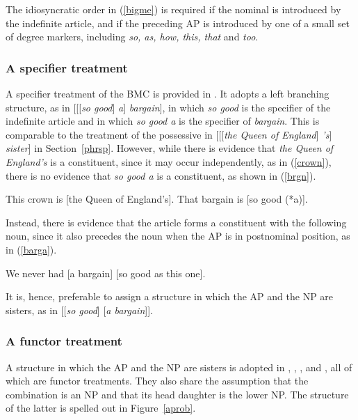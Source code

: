 \documentclass[output=paper
	        ,collection
	        ,collectionchapter
 	        ,biblatex
                ,babelshorthands
                ,newtxmath
                ,draftmode
                ,colorlinks, citecolor=brown
]{langscibook}
\begin{document}
\noindent
The idiosyncratic order in (\ref{bigme}) is required if the nominal is introduced 
by the indefinite article, and if the preceding AP is introduced by one of a small 
set of degree markers, including \emph{so, as, how, this, that} and \emph{too}. 


\subsubsection{A specifier treatment} 


A specifier treatment of the BMC is provided in \citet[201]{GS00}. It adopts  
a left branching structure, as in [[[\emph{so good}] \emph{a}] \emph{bargain}], 
in which \emph{so good} is the specifier of the indefinite article and in which 
\emph{so good a} is the specifier of \emph{bargain}. 
This is comparable to the treatment of the possessive in 
[[[\emph{the Queen of England}] \emph{'s}] \emph{sister}] in Section~\ref{phrsp}.  
However, while there is evidence that \emph{the Queen of England's} is a constituent,
since it may occur independently, as in (\ref{crown}), there is no evidence that 
\emph{so good a} is a constituent, as shown in (\ref{brgn}).

\begin{exe} 
\ex\label{crown}  This crown is [the Queen of England's].
\ex\label{brgn}   That bargain is [so good (*a)]. 
\end{exe} 

\noindent
Instead, there is evidence that the article forms a constituent with the following noun, 
since it also precedes the noun when the AP is in postnominal position, as in (\ref{barga}). 

\begin{exe} 
\ex\label{barga}  We never had [a bargain] [so good as this one].
\end{exe} 

\noindent
It is, hence, preferable to assign a structure in which the AP and the NP are sisters, as in  
[[\emph{so good}] [\emph{a bargain}]]. 


\subsubsection{A functor treatment} 


A structure in which the AP and the NP are sisters is adopted in 
\citet{VanEynde07}, \citet{KimSells11}, \citet{KaySag12}, 
\citet{ArnoldSadler14} and \citet{VanEynde18}, all of which are functor treatments. 
They also share the assumption that the combination is an NP and that its head daughter is 
the lower NP. The structure of the latter is spelled out in Figure~\ref{aprob}. 
\end{document}
